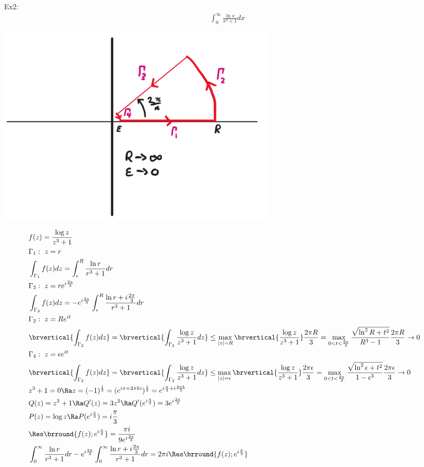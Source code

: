 Ex2:
\begin{align*}
    &\int_0^\infty\frac{\ln x}{x^3+1}dx
\end{align*}
\centerline{\includegraphics[width=0.6\textwidth]{Images/ComplexAnalysisPictures/Pizza.png}}
\begin{align*}
    &f(z)=\frac{\log z}{z^3+1}\\
    &\Gamma_1:\ z=r\\
    &\int_{\Gamma_1}f(z)dz=\int_\epsilon^R\frac{\ln r}{r^3+1}dr\\
    &\Gamma_3:\ z=re^{i\frac{2\pi}{3}}\\
    &\int_{\Gamma_3}f(z)dz=-e^{i\frac{2\pi}{3}}\int_\epsilon^R\frac{\ln r+i\frac{2\pi}{3}}{r^3+1}dr\\
    &\Gamma_2:\ z=Re^{i t}\\
    &\brvertical{\int_{\Gamma_2}f(z)dz}=\brvertical{\int_{\Gamma_2}\frac{\log z}{z^3+1}dz}\leq\max_{|z|=R}\brvertical{\frac{\log z}{z^3+1}}\frac{2\pi R}{3}=\max_{0< t< \frac{2\pi}{3}}\frac{\sqrt{\ln^2R+t^2}}{R^3-1}\frac{2\pi R}{3}\to 0\\
    &\Gamma_4:\ z=\epsilon e^{it}\\
    &\brvertical{\int_{\Gamma_2}f(z)dz}=\brvertical{\int_{\Gamma_2}\frac{\log z}{z^3+1}dz}\leq\max_{|z|=\epsilon}\brvertical{\frac{\log z}{z^3+1}}\frac{2\pi \epsilon}{3}=\max_{0< t< \frac{2\pi}{3}}\frac{\sqrt{\ln^2\epsilon+t^2}}{1-\epsilon^3}\frac{2\pi \epsilon}{3}\to 0\\
    &z^3+1=0\Ra z=(-1)^\frac{1}{3}=(e^{i\pi+2\pi ki})^\frac{1}{3}=e^{i\frac{\pi}{3}+i\frac{2\pi k}{3}}\\
    &Q(z)=z^3+1\Ra Q'(z)=3z^2\Ra Q'(e^{i\frac{\pi}{3}})=3e^{i\frac{2\pi}{3}}\\
    &P(z)=\log z\Ra P(e^{i\frac{\pi}{3}})=i\frac{\pi}{3}\\
    &\Res\brround{f(z);e^{i\frac{\pi}{3}}}=\frac{\pi i}{9e^{i\frac{2\pi}{3}}}\\
    &\int_0^\infty\frac{\ln r}{r^3+1}dr-e^{i\frac{2\pi}{3}}\int_0^\infty\frac{\ln r+i\frac{2\pi}{3}}{r^3+1}dr=2\pi i\Res\brround{f(z);e^{i\frac{\pi}{3}}}\\

\end{align*}
